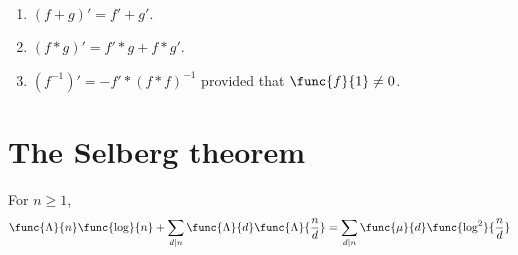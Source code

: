 \begin{theorem}
    \ 
    \begin{enumerate}
        \item \((f + g)' = f' + g'\).
        \item \((f \ast g)' = f' \ast g + f \ast g'\).
        \item \((f^{-1})' = -f' \ast (f \ast f)^{-1}\) provided that \(\func{f}{1} \neq 0\). 
    \end{enumerate}
\end{theorem}

\section{The Selberg theorem}
\begin{theorem}
    For \(n \geq 1\), 
    \begin{equation*}
        \func{\Lambda}{n} \func{\log}{n} + \sum_{d \mid n} \func{\Lambda}{d} \func{\Lambda}{\frac{n}{d}} = \sum_{d \mid n} \func{\mu}{d} \func{\log^2}{\frac{n}{d}}
    \end{equation*}
\end{theorem}